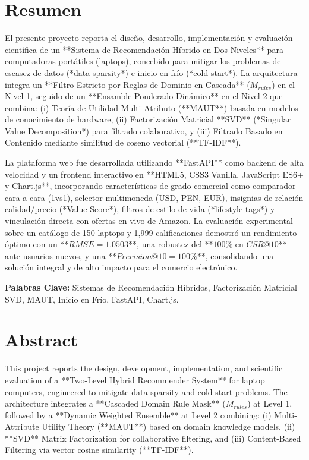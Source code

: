\chapter*{Resumen}

El presente proyecto reporta el diseño, desarrollo, implementación y evaluación científica de un **Sistema de Recomendación Híbrido en Dos Niveles** para computadoras portátiles (laptops), concebido para mitigar los problemas de escasez de datos (*data sparsity*) e inicio en frío (*cold start*). La arquitectura integra un **Filtro Estricto por Reglas de Dominio en Cascada** ($M_{rules}$) en el Nivel 1, seguido de un **Ensamble Ponderado Dinámico** en el Nivel 2 que combina: (i) Teoría de Utilidad Multi-Atributo (**MAUT**) basada en modelos de conocimiento de hardware, (ii) Factorización Matricial **SVD** (*Singular Value Decomposition*) para filtrado colaborativo, y (iii) Filtrado Basado en Contenido mediante similitud de coseno vectorial (**TF-IDF**). 

La plataforma web fue desarrollada utilizando **FastAPI** como backend de alta velocidad y un frontend interactivo en **HTML5, CSS3 Vanilla, JavaScript ES6+ y Chart.js**, incorporando características de grado comercial como comparador cara a cara (1vs1), selector multimoneda (USD, PEN, EUR), insignias de relación calidad/precio (*Value Score*), filtros de estilo de vida (*lifestyle tags*) y vinculación directa con ofertas en vivo de Amazon. La evaluación experimental sobre un catálogo de 150 laptops y 1,999 calificaciones demostró un rendimiento óptimo con un **$RMSE = 1.0503$**, una robustez del **$100\%$ en $CSR@10$** ante usuarios nuevos, y una **$Precision@10 = 100\%$**, consolidando una solución integral y de alto impacto para el comercio electrónico.

\vspace{0.8cm}
\noindent \textbf{Palabras Clave:} Sistemas de Recomendación Híbridos, Factorización Matricial SVD, MAUT, Inicio en Frío, FastAPI, Chart.js.

\clearpage

\chapter*{Abstract}

This project reports the design, development, implementation, and scientific evaluation of a **Two-Level Hybrid Recommender System** for laptop computers, engineered to mitigate data sparsity and cold start problems. The architecture integrates a **Cascaded Domain Rule Mask** ($M_{rules}$) at Level 1, followed by a **Dynamic Weighted Ensemble** at Level 2 combining: (i) Multi-Attribute Utility Theory (**MAUT**) based on domain knowledge models, (ii) **SVD** Matrix Factorization for collaborative filtering, and (iii) Content-Based Filtering via vector cosine similarity (**TF-IDF**).

